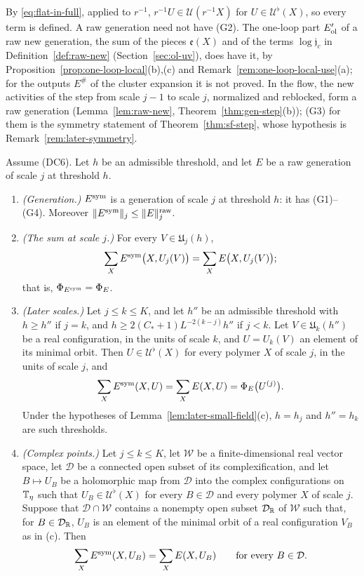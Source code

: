 By \eqref{eq:flat-in-full}, applied to $r^{-1}$, $r^{-1}U\in\mathcal U(r^{-1}X)$ for $U\in\mathcal U^\flat(X)$, so every term is defined. A raw generation need not have (G2). The one-loop part $E'_{\rm ol}$ of a raw new generation, the sum of the pieces $\mathfrak e(X)$ and of the terms $\log\mathfrak j_c$ in Definition~\ref{def:raw-new} (Section~\ref{sec:ol-uv}), does have it, by Proposition~\ref{prop:one-loop-local}(b),(c) and Remark~\ref{rem:one-loop-local-use}(a); for the outputs $E^\#$ of the cluster expansion it is not proved. In the flow, the new activities of the step from scale $j-1$ to scale $j$, normalized and reblocked, form a raw generation (Lemma~\ref{lem:raw-new}, Theorem~\ref{thm:gen-step}(b)); (G3) for them is the symmetry statement of Theorem~\ref{thm:sf-step}, whose hypothesis is Remark~\ref{rem:later-symmetry}.

\begin{lemma}[Symmetrization]\label{lem:symmetrization}
Assume (DC6). Let $h$ be an admissible threshold, and let $E$ be a raw generation of scale $j$ at threshold $h$.
\begin{enumerate}[label=(\alph*)]
\item \emph{(Generation.)} $E^{\rm sym}$ is a generation of scale $j$ at threshold $h$: it has (G1)--(G4). Moreover $\|E^{\rm sym}\|_j\le\|E\|^{\rm raw}_j$.
\item \emph{(The sum at scale $j$.)} For every $V\in\mathfrak U_j(h)$,
\[
\sum_XE^{\rm sym}\big(X,U_j(V)\big)=\sum_XE\big(X,U_j(V)\big);
\]
that is, $\Phi_{E^{\rm sym}}=\Phi_E$.
\item \emph{(Later scales.)} Let $j\le k\le K$, and let $h''$ be an admissible threshold with $h\ge h''$ if $j=k$, and $h\ge2(C_*+1)L^{-2(k-j)}h''$ if $j<k$. Let $V\in\mathfrak U_k(h'')$ be a real configuration, in the units of scale $k$, and $U=U_k(V)$ an element of its minimal orbit. Then $U\in\mathcal U^\flat(X)$ for every polymer $X$ of scale $j$, in the units of scale $j$, and
\[
\sum_XE^{\rm sym}(X,U)=\sum_XE(X,U)=\Phi_E\big(U^{(j)}\big).
\]
Under the hypotheses of Lemma~\ref{lem:later-small-field}(c), $h=h_j$ and $h''=h_k$ are such thresholds.
\item \emph{(Complex points.)} Let $j\le k\le K$, let $\mathcal W$ be a finite-dimensional real vector space, let $\mathcal D$ be a connected open subset of its complexification, and let $B\mapsto U_B$ be a holomorphic map from $\mathcal D$ into the complex configurations on $\mathbb T_\eta$ such that $U_B\in\mathcal U^\flat(X)$ for every $B\in\mathcal D$ and every polymer $X$ of scale $j$. Suppose that $\mathcal D\cap\mathcal W$ contains a nonempty open subset $\mathcal D_\mathbb R$ of $\mathcal W$ such that, for $B\in\mathcal D_\mathbb R$, $U_B$ is an element of the minimal orbit of a real configuration $V_B$ as in (c). Then
\[
\sum_XE^{\rm sym}(X,U_B)=\sum_XE(X,U_B)\qquad\text{for every }B\in\mathcal D .
\]
\end{enumerate}
\end{lemma}

